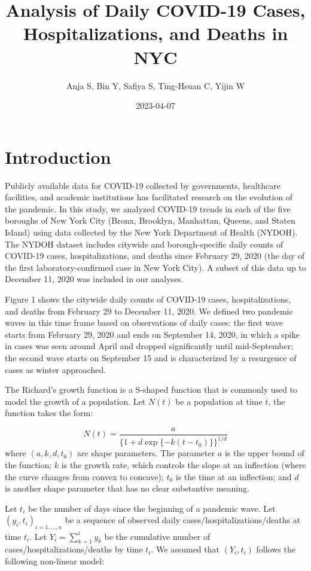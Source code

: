\documentclass[
]{article}
\title{Analysis of Daily COVID-19 Cases, Hospitalizations, and Deaths in
NYC}
\author{Anja S, Bin Y, Safiya S, Ting-Hsuan C, Yijin W}
\date{2023-04-07}
\begin{document}
\maketitle

\hypertarget{introduction}{%
\section{Introduction}\label{introduction}}

Publicly available data for COVID-19 collected by governments,
healthcare facilities, and academic institutions has facilitated
research on the evolution of the pandemic. In this study, we analyzed
COVID-19 trends in each of the five boroughs of New York City (Bronx,
Brooklyn, Manhattan, Queens, and Staten Island) using data collected by
the New York Department of Health (NYDOH). The NYDOH dataset includes
citywide and borough-specific daily counts of COVID-19 cases,
hospitalizations, and deaths since February 29, 2020 (the day of the
first laboratory-confirmed case in New York City). A subset of this data
up to December 11, 2020 was included in our analyses.

Figure 1 shows the citywide daily counts of COVID-19 cases,
hospitalizations, and deaths from February 29 to December 11, 2020. We
defined two pandemic waves in this time frame based on observations of
daily cases: the first wave starts from February 29, 2020 and ends on
September 14, 2020, in which a spike in cases was seen around April and
dropped significantly until mid-September; the second wave starts on
September 15 and is characterized by a resurgence of cases as winter
approached.

The Richard's growth function is a S-shaped function that is commonly
used to model the growth of a population. Let \(N(t)\) be a population
at time \(t\), the function takes the form:

\[N(t) = \frac{a}{\{1 + d \exp\{-k(t-t_0)\}\}^{1/d}}\] where
\((a, k, d, t_0)\) are shape parameters. The parameter \(a\) is the
upper bound of the function; \(k\) is the growth rate, which controls
the slope at an inflection (where the curve changes from convex to
concave); \(t_0\) is the time at an inflection; and \(d\) is another
shape parameter that has no clear substantive meaning.

Let \(t_i\) be the number of days since the beginning of a pandemic
wave. Let \((y_i, t_i)_{i = 1, \ldots, n}\) be a sequence of observed
daily cases/hospitalizations/deaths at time \(t_i\). Let
\(Y_i = \sum_{k=1}^i y_k\) be the cumulative number of
cases/hospitalizations/deaths by time \(t_i\). We assumed that
\((Y_i, t_i)\) follows the following non-linear model:
\end{document}
